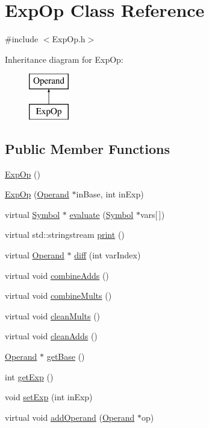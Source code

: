 \hypertarget{class_exp_op}{\section{Exp\+Op Class Reference}
\label{class_exp_op}
}


{\ttfamily \#include $<$Exp\+Op.\+h$>$}

Inheritance diagram for Exp\+Op\+:\begin{figure}[H]
\begin{center}
\leavevmode
\includegraphics[height=2.000000cm]{class_exp_op}
\end{center}
\end{figure}
\subsection*{Public Member Functions}
\begin{DoxyCompactItemize}
\item 
\hyperlink{class_exp_op_a0541c28e82033972a0b7af563631cf7e}{Exp\+Op} ()
\item 
\hyperlink{class_exp_op_a49862bfd8bd893f648cab4833e941ba7}{Exp\+Op} (\hyperlink{class_operand}{Operand} $\ast$in\+Base, int in\+Exp)
\item 
virtual \hyperlink{class_symbol}{Symbol} $\ast$ \hyperlink{class_exp_op_a56abe7525f95bb5aa6b72ba9d68e56b1}{evaluate} (\hyperlink{class_symbol}{Symbol} $\ast$vars\mbox{[}$\,$\mbox{]})
\item 
virtual std\+::stringstream \hyperlink{class_exp_op_ab983d8c531da78f87e13ee7a57031b36}{print} ()
\item 
virtual \hyperlink{class_operand}{Operand} $\ast$ \hyperlink{class_exp_op_a5f9a55e3ca7ee9369bd41be93e41c2a5}{diff} (int var\+Index)
\item 
virtual void \hyperlink{class_exp_op_aebcfcfed0eb87355cf7bc89ae59bfaa1}{combine\+Adds} ()
\item 
virtual void \hyperlink{class_exp_op_aa17e9aa3c005d1edd0259253521a1e44}{combine\+Mults} ()
\item 
virtual void \hyperlink{class_exp_op_a2262538ea97f669be0e30b023071af77}{clean\+Mults} ()
\item 
virtual void \hyperlink{class_exp_op_a2a7d37dbe75ffbe6559dd3ff30ee89db}{clean\+Adds} ()
\item 
\hyperlink{class_operand}{Operand} $\ast$ \hyperlink{class_exp_op_a7ad9f5fd18040981c46a20e6e9a56d7d}{get\+Base} ()
\item 
int \hyperlink{class_exp_op_a56f4e75e8ea62d89177784c7878f5b44}{get\+Exp} ()
\item 
void \hyperlink{class_exp_op_a74320a1ab14fd2a6a0f093f1a18611a6}{set\+Exp} (int in\+Exp)
\item 
virtual void \hyperlink{class_exp_op_ae7c3e828e61808d41b2087cfeeb4cb28}{add\+Operand} (\hyperlink{class_operand}{Operand} $\ast$op)
\end{DoxyCompactItemize}
